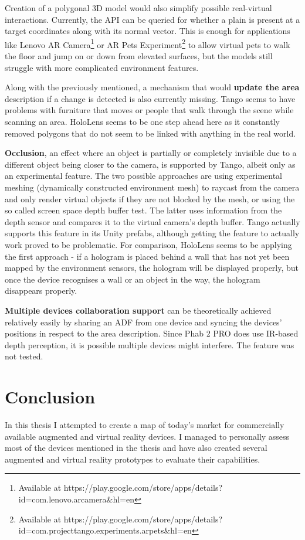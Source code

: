 \documentclass[12pt, a4paper]{article}
\begin{document}
Creation of a polygonal 3D model would also simplify possible real-virtual interactions. Currently, the API can be queried for whether a plain is present at a target coordinates along with its normal vector. This is enough for applications like Lenovo AR Camera\footnote{Available at https://play.google.com/store/apps/details?id=com.lenovo.arcamera\&hl=en} or AR Pets Experiment\footnote{Available at https://play.google.com/store/apps/details?id=com.projecttango.experiments.arpets\&hl=en} to allow virtual pets to walk the floor and jump on or down from elevated surfaces, but the models still struggle with more complicated environment features.

Along with the previously mentioned, a mechanism that would \textbf{update the area} description if a change is detected is also currently missing. Tango seems to have problems with furniture that moves or people that walk through the scene while scanning an area. HoloLens seems to be one step ahead here as it constantly removed polygons that do not seem to be linked with anything in the real world.

\textbf{Occlusion}, an effect where an object is partially or completely invisible due to a different object being closer to the camera, is supported by Tango, albeit only as an experimental feature. The two possible approaches are using experimental meshing (dynamically constructed environment mesh) to raycast from the camera and only render virtual objects if they are not blocked by the mesh, or using the so called screen space depth buffer test. The latter uses information from the depth sensor and compares it to the virtual camera’s depth buffer. Tango actually supports this feature in its Unity prefabs, although getting the feature to actually work proved to be problematic. For comparison, HoloLens seems to be applying the first approach - if a hologram is placed behind a wall that has not yet been mapped by the environment sensors, the hologram will be displayed properly, but once the device recognises a wall or an object in the way, the hologram disappears properly.

\textbf{Multiple devices collaboration support} can be theoretically achieved relatively easily by sharing an ADF from one device and syncing the devices’ positions in respect to the area description. Since Phab 2 PRO does use IR-based depth perception, it is possible multiple devices might interfere. The feature was not tested.

\section{Conclusion}
In this thesis I attempted to create a map of today’s market for commercially available augmented and virtual reality devices. I managed to personally assess most of the devices mentioned in the thesis and have also created several augmented and virtual reality prototypes to evaluate their capabilities.
\end{document}
